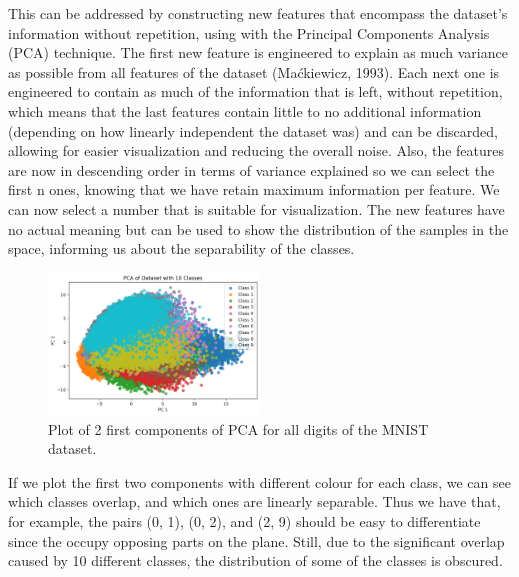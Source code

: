 \documentclass{article}
\begin{document}
This can be addressed by constructing new features that encompass the dataset’s information without repetition, using with the Principal Components Analysis (PCA) technique.
The first new feature is engineered to explain as much variance as possible from all features of the dataset (Maćkiewicz, 1993).
Each next one is engineered to contain as much of the information that is left, without repetition, which means that the last features contain little to no additional information (depending on how linearly independent the dataset was) and can be discarded, allowing for easier visualization and reducing the overall noise.
Also, the features are now in descending order in terms of variance explained so we can select the first n ones, knowing that we have retain maximum information per feature.
We can now select a number that is suitable for visualization.
The new features have no actual meaning but can be used to show the distribution of the samples in the space, informing us about the separability of the classes.

\begin{figure}[h!]
    \centering
    \includegraphics[width=0.5\textwidth]{./plots/plot1.png}
    \caption{Plot of 2 first components of PCA for all digits of the MNIST dataset.}
    \label{fig:plot1}
\end{figure}

If we plot the first two components with different colour for each class, we can see which classes overlap, and which ones are linearly separable.
Thus we have that, for example, the pairs (0, 1), (0, 2), and (2, 9) should be easy to differentiate since the occupy opposing parts on the plane.
Still, due to the significant overlap caused by 10 different classes, the distribution of some of the classes is obscured. 
\end{document}
